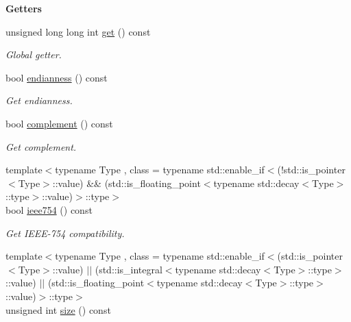 \begin{Indent}{\bf Getters}\par
\begin{DoxyCompactItemize}
\item 
unsigned long long int \hyperlink{exceptionmagrathea_1_1DataModel_a9d1149889f77dbc33b92ca95dbd14c9f}{get} () const 
\begin{DoxyCompactList}\small\item\em Global getter. \end{DoxyCompactList}\item 
bool \hyperlink{exceptionmagrathea_1_1DataModel_aa5ca71372ba0dc99d0cd7fb3b1356cb9}{endianness} () const 
\begin{DoxyCompactList}\small\item\em Get endianness. \end{DoxyCompactList}\item 
bool \hyperlink{exceptionmagrathea_1_1DataModel_a420667dddd99b173f0c3a0838f488ecf}{complement} () const 
\begin{DoxyCompactList}\small\item\em Get complement. \end{DoxyCompactList}\item 
{\footnotesize template$<$typename Type , class  = typename std\-::enable\-\_\-if$<$(!std\-::is\-\_\-pointer$<$\-Type$>$\-::value) \&\& (std\-::is\-\_\-floating\-\_\-point$<$typename std\-::decay$<$\-Type$>$\-::type$>$\-::value)$>$\-::type$>$ }\\bool \hyperlink{exceptionmagrathea_1_1DataModel_af5f475b80c0e36acd57bbddfd1672967}{ieee754} () const 
\begin{DoxyCompactList}\small\item\em Get I\-E\-E\-E-\/754 compatibility.   \end{DoxyCompactList}\item 
{\footnotesize template$<$typename Type , class  = typename std\-::enable\-\_\-if$<$(std\-::is\-\_\-pointer$<$\-Type$>$\-::value) $|$$|$ (std\-::is\-\_\-integral$<$typename std\-::decay$<$\-Type$>$\-::type$>$\-::value) $|$$|$ (std\-::is\-\_\-floating\-\_\-point$<$typename std\-::decay$<$\-Type$>$\-::type$>$\-::value)$>$\-::type$>$ }\\unsigned int \hyperlink{exceptionmagrathea_1_1DataModel_a80bfba6f4da62a6d92cdffe62eee168f}{size} () const 
\end{DoxyCompactItemize}
\end{Indent}
